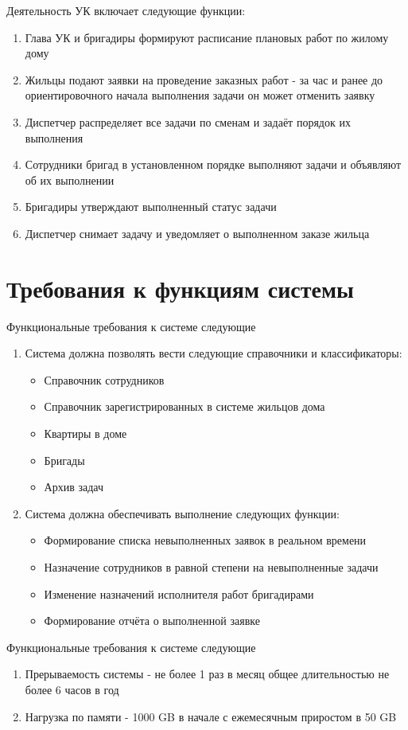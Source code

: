 Деятельность УК включает следующие функции:
\begin{enumerate}
\item Глава УК и бригадиры формируют расписание плановых работ по жилому дому
\item Жильцы подают заявки на проведение заказных работ - за час и ранее до ориентировочного начала выполнения задачи он может отменить заявку
\item Диспетчер распределяет все задачи по сменам и задаёт порядок их выполнения 
\item Сотрудники бригад в установленном порядке выполняют задачи и объявляют об их выполнении
\item Бригадиры утверждают выполненный статус задачи
\item Диспетчер снимает задачу и уведомляет о выполненном заказе жильца
\end{enumerate}

\section{Требования к функциям системы}

Функциональные требования к системе следующие
\begin{enumerate}
\item Система должна позволять вести следующие справочники и классификаторы:
\begin{itemize}
\item Справочник сотрудников
\item Справочник зарегистрированных в системе жильцов дома
\item Квартиры в доме
\item Бригады
\item Архив задач
\end{itemize}
\item Система должна обеспечивать выполнение следующих функции:
\begin{itemize}
\item Формирование списка невыполненных заявок в реальном времени
\item Назначение сотрудников в равной степени на невыполненные задачи 
\item Изменение назначений исполнителя работ бригадирами
\item Формирование отчёта о выполненной заявке
\end{itemize}
\end{enumerate}

Функциональные требования к системе следующие
\begin{enumerate}
\item Прерываемость системы - не более 1 раз в месяц общее длительностью не более 6 часов в год
\item Нагрузка по памяти - 1000 GB в начале с ежемесячным приростом в 50 GB 
\end{enumerate}



